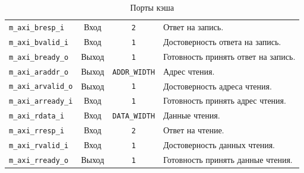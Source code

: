 \begin{table}[H]
\begin{tabularx}{\textwidth}{l c c X}
		\verb|m_axi_bresp_i| &
		Вход &
		\verb|2| &
		Ответ на запись. \\
		
		\verb|m_axi_bvalid_i| &
		Вход &
		\verb|1| &
		Достоверность ответа на запись. \\
		
		\verb|m_axi_bready_o| &
		Выход &
		\verb|1| &
		Готовность принять ответ на запись. \\
		
		\verb|m_axi_araddr_o| &
		Выход &
		\verb|ADDR_WIDTH| &
		Адрес чтения. \\
		
		\verb|m_axi_arvalid_o| &
		Выход &
		\verb|1| &
		Достоверность адреса чтения. \\
		
		\verb|m_axi_arready_i| &
		Вход &
		\verb|1| &
		Готовность принять адрес чтения. \\
		
		\verb|m_axi_rdata_i| &
		Вход &
		\verb|DATA_WIDTH| &
		Данные чтения. \\
		
		\verb|m_axi_rresp_i| &
		Вход &
		\verb|2| &
		Ответ на чтение. \\
		
		\verb|m_axi_rvalid_i| &
		Вход &
		\verb|1| &
		Достоверность данных чтения. \\
		
		\verb|m_axi_rready_o| &
		Выход &
		\verb|1| &
		Готовность принять данные чтения. \\
		
		\bottomrule
	\end{tabularx}
	\caption{Порты кэша}
\end{table}
